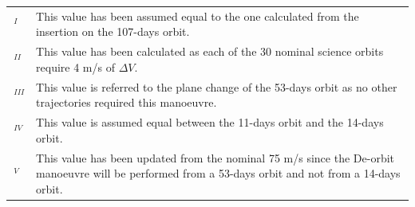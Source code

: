 {
\small
\renewcommand{\arraystretch}{1.1}
\begin{tabularx}{\linewidth}{lX}
    $\,^{I}$ & This value has been assumed equal to the one calculated from the insertion on the 107-days orbit. 
    \\
    $\,^{II}$ & This value has been calculated as each of the 30 nominal science orbits require 4 m/s of $\Delta V$.
    \\
    $\,^{III}$ & This value is referred to the plane change of the 53-days orbit as no other trajectories required this manoeuvre. 
    \\
    $\,^{IV}$ & This value is assumed equal between the 11-days orbit and the 14-days orbit.
    \\
    $\,^{V}$ & This value has been updated from the nominal 75 m/s since the De-orbit manoeuvre will be performed from a 53-days orbit and not from a 14-days orbit.
\end{tabularx}
}